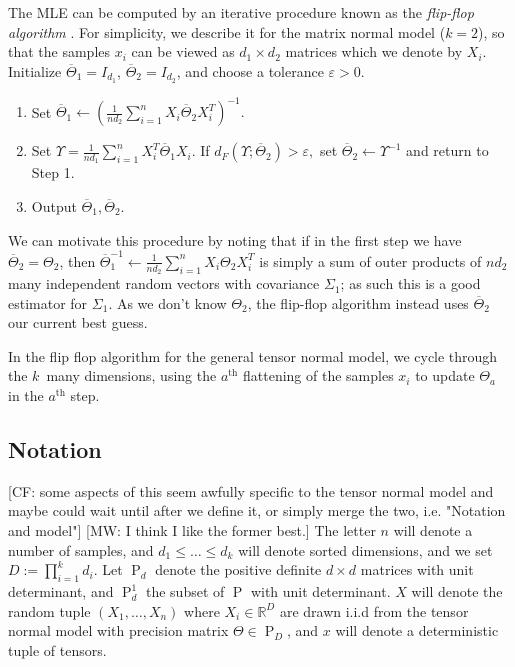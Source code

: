 \documentclass[aos]{imsart}
\theoremstyle{definition}
\newcommand{\R}{{\mathbb{R}}}
\newcommand{\eps}{\varepsilon}
\newcommand{\PD}{\operatorname{P}}
\newcommand{\samp}{x}
\newcommand{\rv}{X}
\newcommand{\CF}[1]{{\color{purple}[CF: #1]}}
\newcommand{\MW}[1]{{\color{red}[MW: #1]}}
\begin{document}
The MLE can be computed by an iterative procedure known as the \emph{flip-flop algorithm} \citep{dutilleul1999mle,gurvits2004classical}.
For simplicity, we describe it for the matrix normal model ($k=2$), so that the samples $\samp_i$ can be viewed as $d_1\times d_2$ matrices which we denote by $X_i$.
Initialize $\overline{\Theta}_1 = I_{d_1}$, $\overline{\Theta}_2 = I_{d_2}$, and choose a tolerance $\eps > 0$.
\begin{enumerate}
\item Set $\overline{\Theta}_1 \leftarrow (\frac{1}{n d_2} \sum_{i = 1}^n X_i \overline{\Theta}_2 X_i^T)^{-1}.$
\item Set $\Upsilon = \frac{1}{n d_1} \sum_{i = 1}^n X_i^T \overline{\Theta}_1 X_i$.
If $d_F( \Upsilon; \overline{\Theta}_2) > \eps,$ set $\overline{\Theta}_2 \leftarrow \Upsilon^{-1}$ and return to Step 1.
\item Output $\overline{\Theta}_1, \overline{\Theta}_2$.
\end{enumerate}

We can motivate this procedure by noting that if in the first step we have $\overline{\Theta}_2 = \Theta_2$, then $\overline{\Theta}_1^{-1} \leftarrow \frac{1}{n d_2} \sum_{i = 1}^n X_i \Theta_2 X_i^T$ is simply a sum of outer products of $nd_2$ many independent random vectors with covariance $\Sigma_1$; as such this is a good estimator for $\Sigma_1$.
As we don't know $\Theta_2$, the flip-flop algorithm instead uses $\overline{\Theta}_2$ our current best guess.

In the flip flop algorithm for the general tensor normal model, we cycle through the $k$~many dimensions, using the $a^\text{th}$ flattening of the samples $x_i$ to update $\Theta_a$ in the $a^\text{th}$ step.


\subsection{Notation}
\CF{some aspects of this seem awfully specific to the tensor normal model and maybe could wait until after we define it, or simply merge the two, i.e. "Notation and model"}
\MW{I think I like the former best.}
The letter $n$ will denote a number of samples, and $d_1\leq \dots \leq d_k$ will denote sorted dimensions, and we set $D:=\prod_{i = 1}^k d_i$. Let $\PD_d$ denote the positive definite $d\times d$ matrices with unit determinant, and $\PD_d^1$ the subset of $\PD$ with unit determinant. $\rv$ will denote the random tuple $(\rv_1, \dots, \rv_n)$ where $\rv_i \in \R^{D}$ are drawn i.i.d from the tensor normal model with precision matrix $\Theta \in \PD_D$, and $\samp$ will denote a deterministic tuple of tensors.
\end{document}
